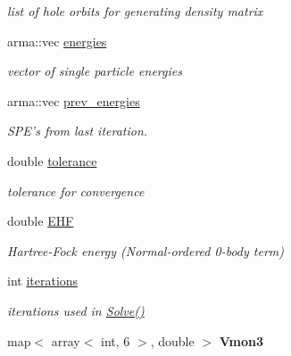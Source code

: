 \begin{DoxyCompactItemize}
\begin{DoxyCompactList}\small\item\em list of hole orbits for generating density matrix \end{DoxyCompactList}\item 
\hypertarget{classHartreeFock_a415fc1fbbba3a6a84d47e31ed18323c9}{arma\-::vec \hyperlink{classHartreeFock_a415fc1fbbba3a6a84d47e31ed18323c9}{energies}}\label{classHartreeFock_a415fc1fbbba3a6a84d47e31ed18323c9}

\begin{DoxyCompactList}\small\item\em vector of single particle energies \end{DoxyCompactList}\item 
\hypertarget{classHartreeFock_a43e2a195ad044947a9e1fb9f3a937d8a}{arma\-::vec \hyperlink{classHartreeFock_a43e2a195ad044947a9e1fb9f3a937d8a}{prev\-\_\-energies}}\label{classHartreeFock_a43e2a195ad044947a9e1fb9f3a937d8a}

\begin{DoxyCompactList}\small\item\em S\-P\-E's from last iteration. \end{DoxyCompactList}\item 
\hypertarget{classHartreeFock_a22c754579ad1a45f053a5305e87d4700}{double \hyperlink{classHartreeFock_a22c754579ad1a45f053a5305e87d4700}{tolerance}}\label{classHartreeFock_a22c754579ad1a45f053a5305e87d4700}

\begin{DoxyCompactList}\small\item\em tolerance for convergence \end{DoxyCompactList}\item 
\hypertarget{classHartreeFock_a16c9e1791919c2ceef5584bdc9b84a81}{double \hyperlink{classHartreeFock_a16c9e1791919c2ceef5584bdc9b84a81}{E\-H\-F}}\label{classHartreeFock_a16c9e1791919c2ceef5584bdc9b84a81}

\begin{DoxyCompactList}\small\item\em Hartree-\/\-Fock energy (Normal-\/ordered 0-\/body term) \end{DoxyCompactList}\item 
\hypertarget{classHartreeFock_a7658fa0b1b05dfa7bf7b8aa7e5fd6bb3}{int \hyperlink{classHartreeFock_a7658fa0b1b05dfa7bf7b8aa7e5fd6bb3}{iterations}}\label{classHartreeFock_a7658fa0b1b05dfa7bf7b8aa7e5fd6bb3}

\begin{DoxyCompactList}\small\item\em iterations used in \hyperlink{classHartreeFock_a0666507747c17845ab4f74b97414703c}{Solve()} \end{DoxyCompactList}\item 
\hypertarget{classHartreeFock_a9a552bb58da8bf501bf97003eec73830}{map$<$ array$<$ int, 6 $>$, double $>$ {\bfseries Vmon3}}\label{classHartreeFock_a9a552bb58da8bf501bf97003eec73830}

\end{DoxyCompactItemize}


